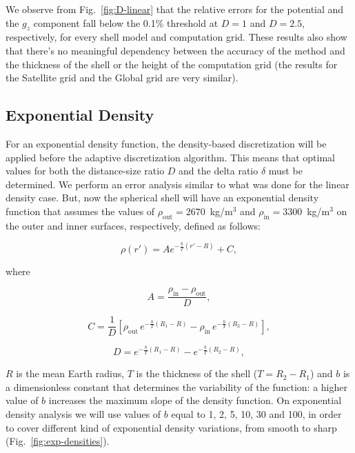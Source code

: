 \documentclass[extra, referee]{gji}
\begin{document}
We observe from Fig.~\ref{fig:D-linear} that the relative errors for the
potential and the $g_z$ component fall below the 0.1\% threshold at
$D=1$ and $D=2.5$, respectively, for every shell model and computation grid.
These results also show that there's no meaningful dependency between the accuracy of
the method and the thickness of the shell or the height of the computation grid (the
results for the Satellite grid and the Global grid are very similar).


\subsection{Exponential Density}

For an exponential density function, the density-based discretization will be applied
before the adaptive discretization algorithm.
This means that optimal values for both the distance-size ratio $D$ and the delta ratio
$\delta$ must be determined.
We perform an error analysis similar to what was done for the linear density case.
But, now the spherical shell will have an exponential density function that assumes the
values of $\rho_\text{out} = 2670$~kg/m$^3$ and $\rho_\text{in} = 3300$~kg/m$^3$ on the
outer and inner surfaces, respectively, defined as follows:

\begin{equation}
    \rho(r') = A e^{- \frac{b}{T} (r' - R)} + C,
    \label{eq:density-exp}
\end{equation}

\noindent where

\begin{equation}
    A = \frac{\rho_\text{in} - \rho_\text{out}}{D},
\end{equation}

\begin{equation}
    C = \frac{1}{D}
    \left[\rho_\text{out} \, e^{- \frac{b}{T} (R_1 - R)} -
    \rho_\text{in} \, e^{- \frac{b}{T} (R_2 - R)} \right],
\end{equation}

\begin{equation}
    D = e^{- \frac{b}{T} (R_1 - R)} - e^{- \frac{b}{T} (R_2 - R)},
\end{equation}

\noindent $R$ is the mean Earth radius, $T$ is the thickness of the shell ($T = R_2
- R_1$) and $b$ is a dimensionless constant that determines the variability of the
function: a higher value of $b$ increases the maximum slope of the density function.
On exponential density analysis we will use values of $b$ equal to 1, 2, 5, 10, 30
and 100, in order to cover different kind of exponential density variations, from smooth
to sharp (Fig.~\ref{fig:exp-densities}).
\end{document}
